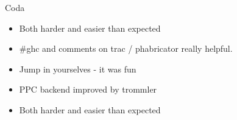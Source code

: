 \documentclass[presentation]{beamer}
\begin{document}
\begin{frame}{Coda}

  \begin{itemize}
    \item Both harder and easier than expected
    \item \#ghc and comments on trac / phabricator really helpful.
    \item Jump in yourselves - it was fun
    \item PPC backend improved by trommler
    \item Both harder and easier than expected
  \end{itemize}

\end{frame}
\end{document}
